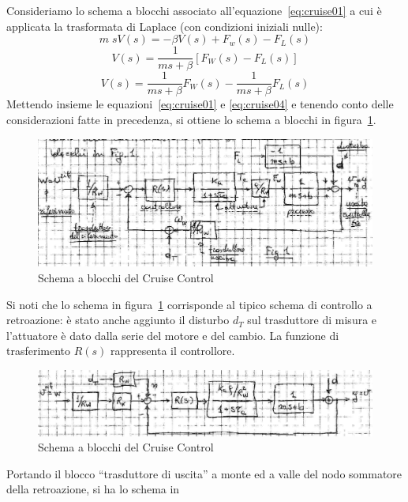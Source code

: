 \documentclass[a4paper]{report}
\begin{document}
Consideriamo lo schema a blocchi associato
all'equazione~\ref{eq:cruise01} a cui \`e applicata la trasformata di
Laplace (con condizioni iniziali nulle):
\[
m\; sV(s) = - \beta V(s) + F_w(s) - F_L(s)
\]
\[
V(s) = \dfrac{1}{ms + \beta} [ F_W(s) - F_L(s)]
\]
\begin{equation}\label{eq:cruise04}
  V(s) = \dfrac{1}{ms + \beta} F_W(s) - \dfrac{1}{ms + \beta} F_L(s)
\end{equation}
Mettendo insieme le equazioni~\ref{eq:cruise01} e \ref{eq:cruise04} e
tenendo conto delle considerazioni fatte in precedenza, si ottiene lo
schema a blocchi in figura~\ref{fig:cruisecontrol01}.
\begin{figure}[!h]
  \begin{center}
    \includegraphics[scale=0.25]{./images/cruisecontrol01}
    \caption{Schema a blocchi del Cruise
      Control}\label{fig:cruisecontrol01}
  \end{center}
\end{figure}
Si noti che lo schema in figura~\ref{fig:cruisecontrol01} corrisponde
al tipico schema di controllo a retroazione: \`e stato anche aggiunto
il disturbo $d_T$ sul trasduttore di misura e l'attuatore \`e dato
dalla serie del motore e del cambio. La funzione di trasferimento
$R(s)$ rappresenta il controllore.
\begin{figure}[!h]
  \begin{center}
    \includegraphics[scale=0.25]{./images/cruisecontrol02}
    \caption{Schema a blocchi del Cruise
      Control}\label{fig:cruisecontrol02}
  \end{center}
\end{figure}
Portando il blocco ``trasduttore di uscita'' a monte ed a valle del
nodo sommatore della retroazione, si ha lo schema in
\end{document}
